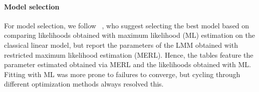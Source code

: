\documentclass[acmlarge, manuscript,review]{acmart}
\begin{document}
\paragraph{Model selection}
For model selection, we follow \citeauthor{zuur2009}~\cite{zuur2009}, who suggest selecting the best model based on comparing likelihoods obtained with maximum likelihood (ML) estimation on the classical linear model, but report the parameters of the LMM obtained with restricted maximum likelihood estimation (MERL). Hence, the tables feature the parameter estimated obtained via MERL and the likelihoods obtained with ML. Fitting with ML was more prone to failures to converge, but cycling through different optimization methods always resolved this.


\end{document}
